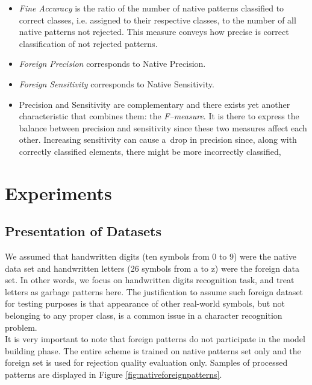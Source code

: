 \documentclass{llncs}
\begin{document}
\begin{itemize}
  \item \emph{Fine Accuracy} is the ratio of the number of native patterns classified to correct classes, i.e. assigned to their respective classes, to the number of all native patterns not rejected. This measure conveys how precise is correct classification of not rejected patterns.
  \item \emph{Foreign Precision} corresponds to Native Precision.
  \item \emph{Foreign Sensitivity} corresponds to Native Sensitivity.
  \item  Precision and Sensitivity are complementary and there exists yet another characteristic that combines them: the \textit{F--measure}. It is there to express the balance between precision and sensitivity since these two measures affect each other. Increasing sensitivity can cause a~drop in precision since, along with correctly classified elements, there might be more incorrectly classified,
\end{itemize}

\section{Experiments}
  \label{sec:Experiments}

\subsection{Presentation of Datasets}
\vspace{-3pt}

We assumed that handwritten digits (ten symbols from 0 to 9) were the native data set and handwritten letters (26 symbols from a to z) were the foreign data set. In other words, we focus on handwritten digits recognition task, and treat letters as garbage patterns here.  The justification to assume such foreign dataset for testing purposes is that appearance of other real-world symbols, but not belonging to any proper class, is a common issue in a character recognition problem. \\

It is very important to note that foreign patterns do not participate in the model building phase. The entire scheme is trained on native patterns set only and the foreign set is used for rejection quality evaluation only. Samples of processed patterns are displayed in Figure \ref{fig:nativeforeignpatterns}. \\
\end{document}
